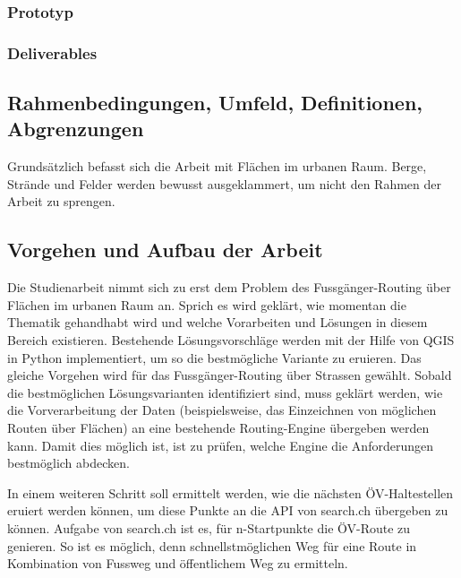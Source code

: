 \subsubsection{Prototyp}
\label{target:Prototyp}


\subsubsection{Deliverables}
\label{target:Deliverables}

	
\subsection{Rahmenbedingungen, Umfeld, Definitionen, Abgrenzungen}
\label{Rahmenbedingungen, Umfeld, Definitionen, Abgrenzungen}
Grundsätzlich befasst sich die Arbeit mit Flächen im urbanen Raum. Berge, Strände und Felder werden bewusst ausgeklammert, um nicht den Rahmen der Arbeit zu sprengen.


\subsection{Vorgehen und Aufbau der Arbeit}
\label{Vorgehen und Aufbau der Arbeit}
Die Studienarbeit nimmt sich zu erst dem Problem des Fussgänger-Routing über Flächen im urbanen Raum an. Sprich es wird geklärt, wie momentan die Thematik gehandhabt wird und welche Vorarbeiten und Lösungen in diesem Bereich existieren. Bestehende Lösungsvorschläge werden mit der Hilfe von QGIS in Python implementiert, um so die bestmögliche Variante zu eruieren. Das gleiche Vorgehen wird für das Fussgänger-Routing über Strassen gewählt. Sobald die bestmöglichen Lösungsvarianten identifiziert sind, muss geklärt werden, wie die Vorverarbeitung der Daten (beispielsweise, das Einzeichnen von möglichen Routen über Flächen) an eine bestehende Routing-Engine übergeben werden kann. Damit dies möglich ist, ist zu prüfen, welche Engine die Anforderungen bestmöglich abdecken.

In einem weiteren Schritt soll ermittelt werden, wie die nächsten ÖV-Haltestellen eruiert werden können, um diese Punkte an die API von search.ch übergeben zu können. Aufgabe von search.ch ist es, für n-Startpunkte die ÖV-Route zu genieren. So ist es möglich, denn schnellstmöglichen Weg für eine Route in Kombination von Fussweg und öffentlichem Weg zu ermitteln.

